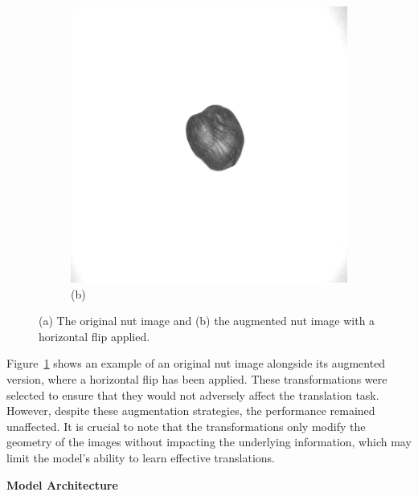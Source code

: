 \documentclass[12pt,DIV14,BCOR12mm,a4paper,footinclude=false,headinclude,parskip=half-,twoside,openright,cleardoublepage=empty,toc=index,bibliography=totoc,listof=totoc]{scrreprt}
\numberwithin{equation}{chapter}
\begin{document}
\begin{figure}
\begin{subfigure}[b]{0.45\textwidth}
        \includegraphics[scale=0.15]{../media/augmented_horizontal_flip.png} %
        \caption*{(b)}
    \end{subfigure}
    \caption{(a) The original nut image and (b) the augmented nut image with a horizontal flip applied.}
    \label{fig:nut_comparison}
\end{figure}

Figure~\ref{fig:nut_comparison} shows an example of an original nut image alongside its augmented version, where a horizontal flip has been applied.
These transformations were selected to ensure that they would not adversely affect the translation task. However, despite these augmentation strategies, the performance remained unaffected. It is crucial to note that the transformations only modify the geometry of the images without impacting the underlying information, which may limit the model's ability to learn effective translations.

\textbf{Model Architecture}
\end{document}
